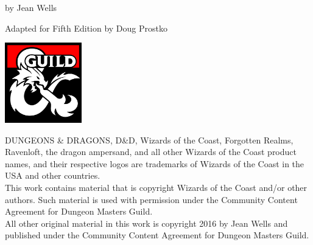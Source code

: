 \documentclass[10pt,twoside,twocolumn]{article}
\begin{document}
\begin{titlepage}
\begin{onecolumn}
\begin{center}
	\vspace{0.5cm}

	
	{\Large by Jean Wells}

	{\Large Adapted for Fifth Edition by Doug Prostko}
	
	\vspace{0.35cm}
	\includegraphics[width=0.25\textwidth]{img/dmsguild.jpg}
\end{center}

\begin{minipage}{0.94\textwidth}
{\footnotesize
	DUNGEONS \& DRAGONS, D\&D, Wizards of the Coast, Forgotten Realms,
	Ravenloft, the dragon ampersand, and all other Wizards of the Coast
	product names, and their respective logos are trademarks of Wizards
	of the Coast in the USA and other countries.\\ This work contains
	material that is copyright Wizards of the Coast and/or other
	authors. Such material is used with permission under the Community
	Content Agreement for Dungeon Masters Guild.\\ All other original
	material in this work is copyright 2016 by Jean Wells and published
	under the Community Content Agreement for Dungeon Masters Guild.}
\end{minipage} \end{onecolumn} \end{titlepage} \clearpage

\renewcommand{\cfttoctitlefont}{\color{titlered}\normalfont\scshape\Huge}
\setcounter{tocdepth}{2}
\begin{onecolumn}
\tableofcontents
\end{onecolumn}








\end{document}
